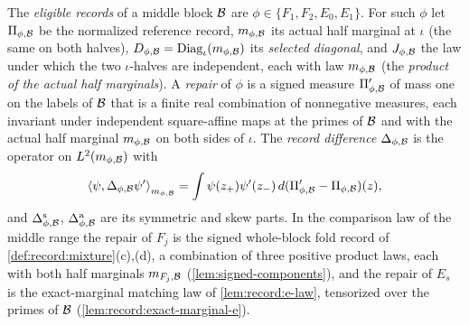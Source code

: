 \begin{definition}\label{def:record:eligible}
The \emph{eligible records} of a middle block $\mathcal B$ are
$\phi\in\{F_1,F_2,E_0,E_1\}$. For such $\phi$ let $\Pi_{\phi,\mathcal B}$ be the
normalized reference record, $m_{\phi,\mathcal B}$ its actual half marginal at $\iota$
(the same on both halves), $D_{\phi,\mathcal B}=\operatorname{Diag}_\iota(m_{\phi,\mathcal B})$
its \emph{selected diagonal}, and $J_{\phi,\mathcal B}$ the law under which the two
$\iota$-halves are independent, each with law $m_{\phi,\mathcal B}$ (the
\emph{product of the actual half marginals}). A \emph{repair} of $\phi$ is a
signed measure $\Pi'_{\phi,\mathcal B}$ of mass one on the labels of $\mathcal B$ that is a
finite real combination of nonnegative measures, each invariant under
independent square-affine maps at the primes of $\mathcal B$ and with the actual half
marginal $m_{\phi,\mathcal B}$ on both sides of $\iota$. The \emph{record difference}
$\Delta_{\phi,\mathcal B}$ is the operator on $L^2(m_{\phi,\mathcal B})$ with
\[
 \left\langle \psi,\Delta_{\phi,\mathcal B}\psi'\right\rangle_{m_{\phi,\mathcal B}}
 =\int\psi(z_+)\psi'(z_-)\,d(\Pi'_{\phi,\mathcal B}-\Pi_{\phi,\mathcal B})(z),
\]
and $\Delta^{\rm s}_{\phi,\mathcal B}$, $\Delta^{\rm a}_{\phi,\mathcal B}$ are its symmetric and
skew parts. In the comparison law of the middle range the repair of $F_j$ is
the signed whole-block fold record of \cref{def:record:mixture}(c),(d), a
combination of three positive product laws, each with both half marginals
$m_{F_j,\mathcal B}$ (\cref{lem:signed-components}), and the repair of $E_s$ is the
exact-marginal matching law of \cref{lem:record:e-law}, tensorized over the
primes of $\mathcal B$ (\cref{lem:record:exact-marginal-e}).
\end{definition}


